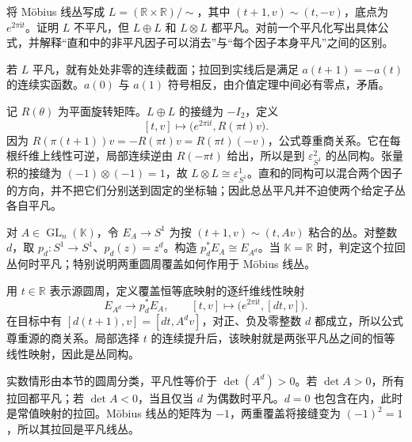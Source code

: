 \begin{exercise}\label{g2:ex:double-mobius-trivialization}
	将 Möbius 线丛写成 \(L=(\mathbb R\times\mathbb R)/\!\sim\)，其中 \((t+1,v)\sim(t,-v)\)，底点为 \(e^{2\pi\mathrm i t}\)。证明 \(L\) 不平凡，但 \(L\oplus L\) 和 \(L\otimes L\) 都平凡。对前一个平凡化写出具体公式，并解释“直和中的非平凡因子可以消去”与“每个因子本身平凡”之间的区别。
\end{exercise}
\begin{solution}
	若 \(L\) 平凡，就有处处非零的连续截面；拉回到实线后是满足 \(a(t+1)=-a(t)\) 的连续实函数。\(a(0)\) 与 \(a(1)\) 符号相反，由介值定理中间必有零点，矛盾。

	记 \(R(\theta)\) 为平面旋转矩阵。\(L\oplus L\) 的接缝为 \(-I_2\)，定义
	\[
		[t,v]\longmapsto\bigl(e^{2\pi\mathrm i t},R(\pi t)v\bigr).
	\]
	因为 \(R(\pi(t+1))v=-R(\pi t)v=R(\pi t)(-v)\)，公式尊重商关系。它在每根纤维上线性可逆，局部连续逆由 \(R(-\pi t)\) 给出，所以是到 \(\varepsilon_{S^1}^2\) 的丛同构。张量积的接缝为 \((-1)\otimes(-1)=1\)，故 \(L\otimes L\cong\varepsilon_{S^1}^1\)。直和的同构可以混合两个因子的方向，并不把它们分别送到固定的坐标轴；因此总丛平凡并不迫使两个给定子丛各自平凡。
\end{solution}

\begin{exercise}\label{g2:ex:circle-pullback-clutching-power}
	对 \(A\in\operatorname{GL}_n(\mathbb K)\)，令 \(E_A\to S^1\) 为按 \((t+1,v)\sim(t,Av)\) 粘合的丛。对整数 \(d\)，取 \(p_d:S^1\to S^1\)、\(p_d(z)=z^d\)。构造 \(p_d^*E_A\cong E_{A^d}\)。当 \(\mathbb K=\mathbb R\) 时，判定这个拉回丛何时平凡；特别说明两重圆周覆盖如何作用于 Möbius 线丛。
\end{exercise}
\begin{solution}
	用 \(t\in\mathbb R\) 表示源圆周，定义覆盖恒等底映射的逐纤维线性映射
	\[
		E_{A^d}\longrightarrow p_d^*E_A,
		\qquad [t,v]\longmapsto\bigl(e^{2\pi\mathrm i t},[dt,v]\bigr).
	\]
	在目标中有 \([d(t+1),v]=[dt,A^dv]\)，对正、负及零整数 \(d\) 都成立，所以公式尊重源的商关系。局部选择 \(t\) 的连续提升后，该映射就是两张平凡丛之间的恒等线性映射，因此是丛同构。

	实数情形由本节的圆周分类，平凡性等价于 \(\det(A^d)>0\)。若 \(\det A>0\)，所有拉回都平凡；若 \(\det A<0\)，当且仅当 \(d\) 为偶数时平凡。\(d=0\) 也包含在内，此时是常值映射的拉回。Möbius 线丛的矩阵为 \(-1\)，两重覆盖将接缝变为 \((-1)^2=1\)，所以其拉回是平凡线丛。
\end{solution}

